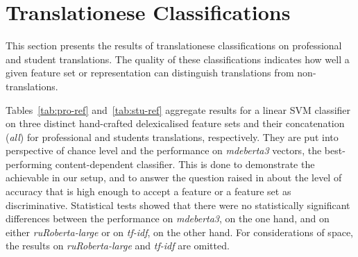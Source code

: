\section{\label{sec:detect}Translationese Classifications}

This section presents the results of translationese classifications on professional and student translations. The quality of these classifications indicates how well a given feature set or representation can distinguish translations from non-translations. 

Tables~\ref{tab:pro-ref} and~\ref{tab:stu-ref} aggregate results for a linear SVM classifier on three distinct hand-crafted delexicalised feature sets and their concatenation (\textit{all}) for professional and students translations, respectively. 
They are put into perspective of chance level and the performance on \textit{mdeberta3} vectors, the best-performing content-dependent classifier.
This is done to demonstrate the achievable in our setup, and to answer the question raised in \citet{Hu2021} about the level of accuracy that is high enough to accept a feature or a feature set as discriminative. Statistical tests showed that there were no statistically significant differences between the performance on \textit{mdeberta3}, on the one hand, and on either \textit{ruRoberta-large} or on \textit{tf-idf}, on the other hand. For considerations of space, the results on \textit{ruRoberta-large} and \textit{tf-idf} are omitted.

